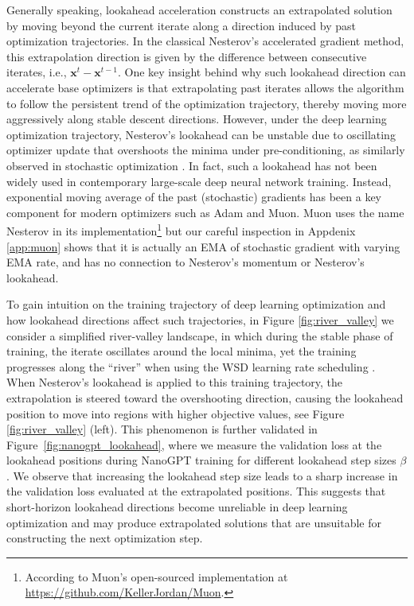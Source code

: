 \documentclass{article}
\theoremstyle{plain}
\theoremstyle{definition}
\theoremstyle{remark}
\begin{document}
Generally speaking, lookahead acceleration constructs an extrapolated solution by moving beyond the current iterate along a direction induced by past optimization trajectories. In the classical Nesterov's accelerated gradient method, this extrapolation direction is given by the difference between consecutive iterates, i.e., $\mathbf{x}^t - \mathbf{x}^{t-1}$. 
One key insight behind why such lookahead direction can accelerate base optimizers is that extrapolating past iterates allows the algorithm to follow the persistent trend of the optimization trajectory, thereby moving more aggressively along stable descent directions. However, under the deep learning optimization trajectory, Nesterov's lookahead can be unstable due to oscillating optimizer update that overshoots the minima under pre-conditioning, as similarly observed in stochastic optimization \citep{wang2022scheduled}. In fact, such a lookahead has not been widely used in contemporary large-scale deep neural network training. 
Instead, exponential moving average of the past (stochastic) gradients has been a key component for modern optimizers such as Adam and Muon.
Muon uses the name Nesterov in its implementation\footnote{According to Muon's open-sourced implementation at \url{https://github.com/KellerJordan/Muon}.} but our careful inspection in Appdenix \ref{app:muon} shows that it is actually an EMA of stochastic gradient with varying EMA rate, and has no connection to Nesterov's momentum or Nesterov's lookahead.



To gain intuition on the training trajectory of deep learning optimization and how lookahead directions affect such trajectories, in Figure \ref{fig:river_valley} we consider a simplified river-valley landscape, in which during the stable phase of training, the iterate oscillates around the local minima, yet the training progresses  along the ``river'' when using the WSD learning rate scheduling \citep{wen2024understanding}.
When Nesterov's lookahead is applied to this training trajectory, the extrapolation is steered toward the overshooting direction, causing the lookahead position to move into regions with higher objective values, see Figure \ref{fig:river_valley} (left). {This phenomenon is further validated in Figure~\ref{fig:nanogpt_lookahead}, where we measure the validation loss at the lookahead positions during NanoGPT training for different lookahead step sizes $\beta$. We observe that increasing the lookahead step size leads to a sharp increase in the validation loss evaluated at the extrapolated positions. This suggests that short-horizon lookahead directions become unreliable in deep learning optimization and may produce extrapolated solutions that are unsuitable for constructing the next optimization step.}
\end{document}
